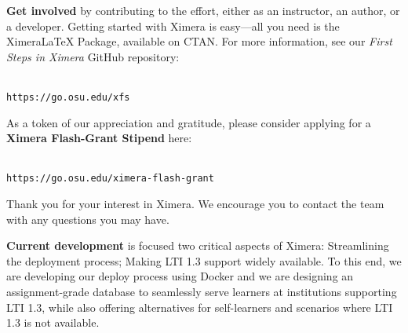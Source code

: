 \documentclass[twocolumn]{article}
\begin{document}
\begin{xframe}
    {\sffamily\bfseries Get involved} by contributing to the effort,
    either as an instructor, an author, or a developer. Getting started with
    Ximera is
    easy---all you need is the XimeraLaTeX Package, available on CTAN. For more
    information, see our \textit{First Steps in Ximera} GitHub repository:
    \begin{center}
        \\
        \small\tt  https://go.osu.edu/xfs
    \end{center}
    As a token of our appreciation and gratitude, please  consider applying for a \textbf{Ximera Flash-Grant Stipend} here:
    \begin{center}
        \\
        \small\tt  https://go.osu.edu/ximera-flash-grant
    \end{center}
    Thank you for your interest in Ximera. We encourage you to contact the team
    with  any questions you may have.
\end{xframe}

\begin{xframe}
    {\sffamily\bfseries Current development} is focused two critical
    aspects of Ximera: Streamlining the deployment
    process; Making LTI 1.3 support widely available.
    To this end, we are
    developing our
    deploy process using Docker and we are designing an assignment-grade
    database to
    seamlessly serve  learners at institutions supporting LTI 1.3, while also
    offering alternatives for self-learners and scenarios where
    LTI 1.3 is not available.
    \begin{center}
    \end{center}

\end{xframe}
\end{document}
